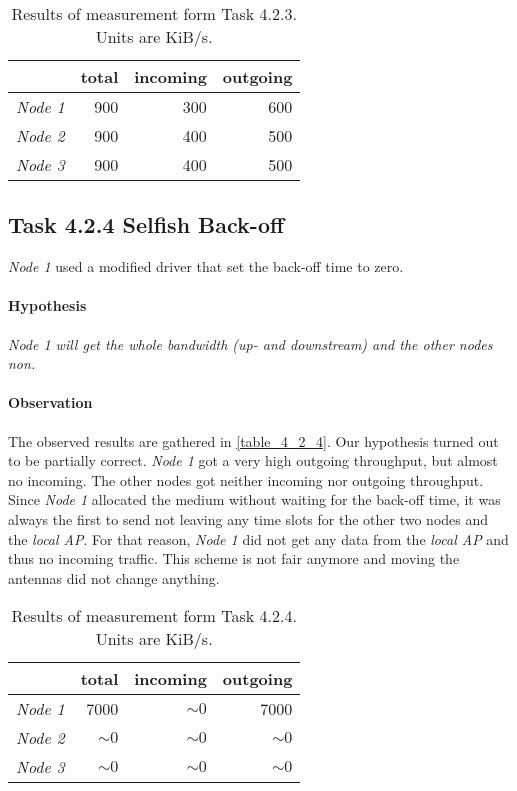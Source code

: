 \documentclass[12pt,a4paper]{article}
\begin{document}
\begin{table}
	\begin{center}
		\begin{tabular}{r|r|r|r}\
		 & total & incoming & outgoing \\
		 \hline 
		 \emph{Node 1} & 900 & 300 & 600 \\
		 \emph{Node 2} & 900 & 400 & 500 \\
		 \emph{Node 3} & 900 & 400 & 500 \\
		\end{tabular}
		
		\caption{Results of measurement form Task 4.2.3. Units are KiB/s.}
		\label{table_4_2_3}
	\end{center}
	\end{table}

\subsection{Task 4.2.4 Selfish Back-off}
\emph{Node 1} used a modified driver that set the back-off time to zero.

\paragraph{Hypothesis}
\emph{Node 1 will get the whole bandwidth (up- and downstream) and the other nodes non.}

\paragraph{Observation}
The observed results are gathered in \autoref{table_4_2_4}.
Our hypothesis turned out to be partially correct.
\emph{Node 1} got a very high outgoing throughput, but almost no incoming.
The other nodes got neither incoming nor outgoing throughput.
Since \emph{Node 1} allocated the medium without waiting for the back-off time, it was always the first to send not leaving any time slots for the other two nodes and the \emph{local AP}. For that reason, \emph{Node 1} did not get any data from the \emph{local AP} and thus no incoming traffic.
This scheme is not fair anymore and moving the antennas did not change anything.

\begin{table}
	\begin{center}
		\begin{tabular}{r|r|r|r}\
		 & total & incoming & outgoing \\
		 \hline 
		 \emph{Node 1} & 7000 & $\sim0$ & 7000 \\
		 \emph{Node 2} & $\sim0$ & $\sim0$ & $\sim0$ \\
		 \emph{Node 3} & $\sim0$ & $\sim0$ & $\sim0$ \\
		\end{tabular}
		
		\caption{Results of measurement form Task 4.2.4. Units are KiB/s.}
		\label{table_4_2_4}
	\end{center}
	\end{table}
\end{document}
